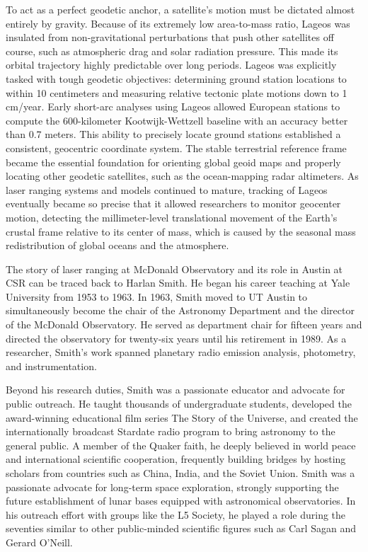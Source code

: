 To act as a perfect geodetic anchor, a satellite's motion must be dictated almost entirely by gravity. Because of its extremely low area-to-mass ratio, Lageos was insulated from non-gravitational perturbations that push other satellites off course, such as atmospheric drag and solar radiation pressure. This made its orbital trajectory highly predictable over long periods. Lageos was explicitly tasked with tough geodetic objectives: determining ground station locations to within 10 centimeters and measuring relative tectonic plate motions down to 1 cm/year. Early short-arc analyses using Lageos allowed European stations to compute the 600-kilometer Kootwijk-Wettzell baseline with an accuracy better than 0.7 meters. This ability to precisely locate ground stations established a consistent, geocentric coordinate system. The stable terrestrial reference frame became the essential foundation for orienting global geoid maps and properly locating other geodetic satellites, such as the ocean-mapping radar altimeters. As laser ranging systems and models continued to mature, tracking of Lageos eventually became so precise that it allowed researchers to monitor geocenter motion, detecting the millimeter-level translational movement of the Earth's crustal frame relative to its center of mass, which is caused by the seasonal mass redistribution of global oceans and the atmosphere.

The story of laser ranging at McDonald Observatory and its role in Austin at CSR can be traced back to Harlan Smith. He began his career teaching at Yale University from 1953 to 1963. In 1963, Smith moved to UT Austin to simultaneously become the chair of the Astronomy Department and the director of the McDonald Observatory. He served as department chair for fifteen years and directed the observatory for twenty-six years until his retirement in 1989. As a researcher, Smith's work spanned planetary radio emission analysis, photometry, and instrumentation. 

Beyond his research duties, Smith was a passionate educator and advocate for public outreach. He taught thousands of undergraduate students, developed the award-winning educational film series The Story of the Universe, and created the internationally broadcast Stardate radio program to bring astronomy to the general public. A member of the Quaker faith, he deeply believed in world peace and international scientific cooperation, frequently building bridges by hosting scholars from countries such as China, India, and the Soviet Union. Smith was a passionate advocate for long-term space exploration, strongly supporting the future establishment of lunar bases equipped with astronomical observatories. In his outreach effort with groups like the L5 Society, he played a role during the seventies similar to other public-minded scientific figures such as Carl Sagan and Gerard O’Neill.

